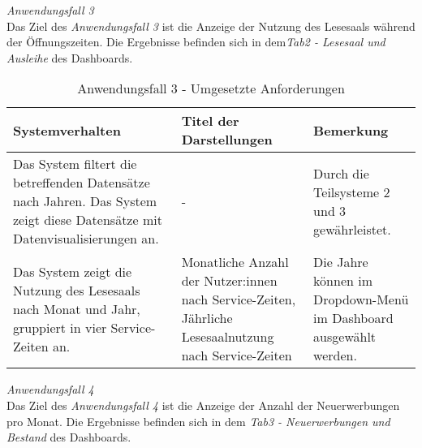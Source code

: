     \endgroup

\clearpage
\noindent
\textit{Anwendungsfall 3}\\
Das Ziel des \textit{Anwendungsfall 3} ist die Anzeige der Nutzung des Lesesaals während der Öffnungszeiten.
Die Ergebnisse befinden sich in dem\textit{Tab2 - Lesesaal und Ausleihe} des Dashboards.

\begingroup
    \setlength{\tabcolsep}{12pt} %
    \renewcommand{\arraystretch}{1.5}
    \begin{table}[h]
        \Large
        \centering
        \begin{adjustbox}{max width=\textwidth}
        \begin{tabular}{p{}p{}p{}}
           \toprule
           Systemverhalten        &Titel der Darstellungen&Bemerkung\\
           \midrule
           Das System filtert die betreffenden Datensätze nach Jahren. Das System zeigt diese Datensätze mit Datenvisualisierungen an.&-&Durch die Teilsysteme 2  und 3 gewährleistet.\\
           Das System zeigt die Nutzung des Lesesaals nach Monat und Jahr, gruppiert in vier Service-Zeiten an.&Monatliche Anzahl der Nutzer:innen nach Service-Zeiten, Jährliche Lesesaalnutzung nach Service-Zeiten& Die Jahre können im Dropdown-Menü im Dashboard ausgewählt werden.\\

        \bottomrule
        \end{tabular}
        \end{adjustbox}
        \caption{%
            Anwendungsfall 3 - Umgesetzte Anforderungen
        }
        \label{tab:Anwendungsfall 3 - Umgesetzte Anforderungen}
        \end{table}
\endgroup

\clearpage
\noindent
\textit{Anwendungsfall 4}\\
Das Ziel des \textit{Anwendungsfall 4} ist die Anzeige der Anzahl der Neuerwerbungen pro Monat.
Die Ergebnisse befinden sich in dem \textit{Tab3 - Neuerwerbungen und Bestand} des Dashboards.

